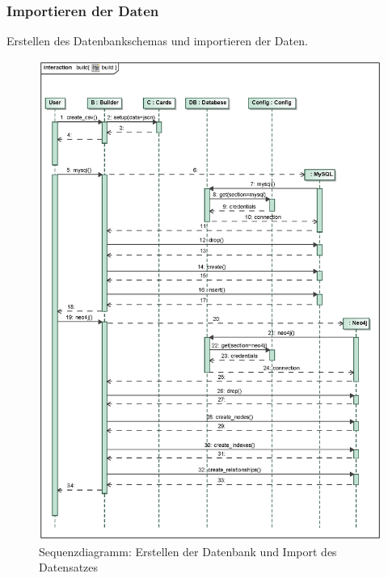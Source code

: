 \subsubsection{Importieren der Daten}
Erstellen des Datenbankschemas und importieren der Daten.
\begin{figure}[H]
    \myfloatalign
    \includegraphics[width=1.1\textwidth]{gfx/MtGDeepAnalysis/cli_build.eps}
    \caption{Sequenzdiagramm: Erstellen der Datenbank und Import des Datensatzes} 
    \label{fig:seq:build}
\end{figure}

